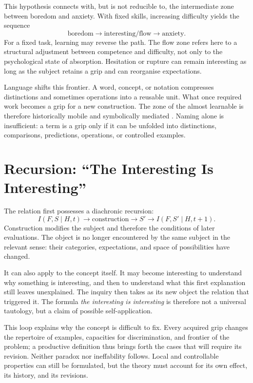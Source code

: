 \documentclass[11pt,a4paper]{article}
\begin{document}
This hypothesis connects with, but is not reducible to, the intermediate zone
between boredom and anxiety. With fixed skills, increasing difficulty yields
the sequence
\[
  \text{boredom}\longrightarrow\text{interesting/flow}
  \longrightarrow\text{anxiety}.
\]
For a fixed task, learning may reverse the path. The flow zone refers here to a
structural adjustment between competence and difficulty, not only to the
psychological state of absorption. Hesitation or rupture can remain interesting
as long as the subject retains a grip and can reorganise expectations.

Language shifts this frontier. A word, concept, or notation compresses
distinctions and sometimes operations into a reusable unit. What once required
work becomes a grip for a new construction. The zone of the almost learnable is
therefore historically mobile and symbolically mediated
\parencite{vygotsky1978mind,lenat1991thresholds,lenat2008turtle,koestler1989act,steels2005coordinating,steels2015talkingheads}.
Naming alone is insufficient: a term is a grip only if it can be unfolded into
distinctions, comparisons, predictions, operations, or controlled examples.

\section{Recursion: ``The Interesting Is Interesting''}

The relation first possesses a diachronic recursion:
\[
  I(F,S\mid H,t)\longrightarrow
  \text{construction}\longrightarrow S'
  \longrightarrow I(F,S'\mid H,t+1).
\]
Construction modifies the subject and therefore the conditions of later
evaluations. The object is no longer encountered by the same subject in the
relevant sense: their categories, expectations, and space of possibilities
have changed.

It can also apply to the concept itself. It may become interesting to
understand why something is interesting, and then to understand what this first
explanation still leaves unexplained. The inquiry then takes as its new object
the relation that triggered it. The formula \emph{the interesting is
interesting} is therefore not a universal tautology, but a claim of possible
self-application.

This loop explains why the concept is difficult to fix. Every acquired grip
changes the repertoire of examples, capacities for discrimination, and frontier
of the problem; a productive definition thus brings forth the cases that will
require its revision. Neither paradox nor ineffability follows. Local and
controllable properties can still be formulated, but the theory must account
for its own effect, its history, and its revisions.
\end{document}
